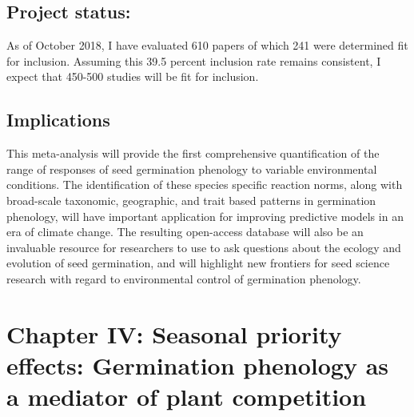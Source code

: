 \documentclass[12pt]{article}\usepackage[]{graphicx}\usepackage[]{color}
\begin{document}
\subsection*{Project status:}
As of October 2018, I have evaluated 610 papers of which 241 were determined fit for inclusion. Assuming this 39.5 percent inclusion rate remains consistent, I expect that 450-500 studies will be fit for inclusion.
\subsection*{Implications}
\indent\indent This meta-analysis will provide the first comprehensive quantification of the range of responses of seed germination phenology to variable environmental conditions. The identification of these species specific reaction norms, along with broad-scale taxonomic, geographic, and trait based patterns in germination phenology, will have important application for improving predictive models in an era of climate change. The resulting open-access database will also be an invaluable resource for researchers to use to ask questions about the ecology and evolution of seed germination, and will highlight new frontiers for seed science research with regard to environmental control of germination phenology.

\section*{Chapter IV: Seasonal priority effects: Germination phenology as a mediator of plant competition}
\end{document}
